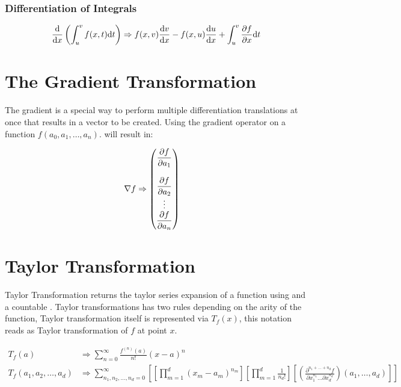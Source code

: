 \documentclass[11pt,a4paper]{book}
\begin{document}
\subsubsection{Differentiation of Integrals}

\begin{equation}
\frac{\text{d}}{\text{d}x} \left(\int_{u}^{v} f(x, t) \text{d}t\right) \Rightarrow f(x, v)\frac{\text{d}v}{\text{d}x} - f(x, u) \frac{\text{d}u}{\text{d}x} + \int_{u}^{v}  \frac{\partial f}{\partial x} \text{d}t
\end{equation}

\section{The Gradient Transformation}
The gradient is a special way to perform multiple differentiation translations at once that results in a vector to be created. Using the gradient operator on a function $f(a_0, a_1, \dots, a_n)$. will result in:

\begin{align}
\nabla f &\Rightarrow \begin{pmatrix}
           \displaystyle\frac{\partial f}{\partial a_1}\\[0.1em]\\
           \displaystyle\frac{\partial f}{\partial a_2} \\
           \vdots \\
           \displaystyle\frac{\partial f}{\partial a_n}
         \end{pmatrix}
\end{align}

\section{Taylor Transformation}

Taylor Transformation returns the taylor series expansion of a function using  and a countable . Taylor transformations has two rules depending on the arity of the function, Taylor transformation itself is represented via $T_f(x)$, this notation reads as Taylor transformation of $f$ at point $x$.

\begin{align}
T_f(a) &\Rightarrow \sum_{n = 0}^{\infty} \frac{f^{(n)}(a)}{n!}(x - a)^n\\
T_f(a_1, a_2, \dots, a_d) &\Rightarrow \sum_{n_1, n_2, \dots, n_d = 0}^{\infty} \left[ \left[ \prod_{m = 1}^d (x_m - a_m)^{n_m} \right] \left[ \prod_{m=1}^d \frac{1}{n_d!} \right] \left[\left( \frac{\partial^{n_1 + \dots + n_d} f}{\partial x_1^{n_1} \dots \partial x_d^{n_d}} \right)(a_1, \dots, a_d) \right] \right]
\end{align} 
\end{document}

